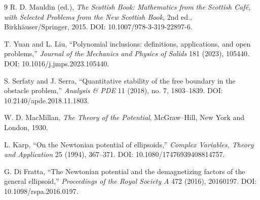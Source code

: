 \documentclass[11pt]{article}
\theoremstyle{definition}
\theoremstyle{remark}
\newcommand{\1}{\mathbf{1}}
\begin{document}
\begin{thebibliography}{9}
R. D. Mauldin (ed.), \emph{The Scottish Book: Mathematics from the Scottish Caf\'e, with Selected Problems from the New Scottish Book}, 2nd ed., Birkh\"auser/Springer, 2015. DOI: 10.1007/978-3-319-22897-6.

T. Yuan and L. Liu, ``Polynomial inclusions: definitions, applications, and open problems,'' \emph{Journal of the Mechanics and Physics of Solids} 181 (2023), 105440. DOI: 10.1016/j.jmps.2023.105440.

S. Serfaty and J. Serra, ``Quantitative stability of the free boundary in the obstacle problem,'' \emph{Analysis \& PDE} 11 (2018), no. 7, 1803--1839. DOI: 10.2140/apde.2018.11.1803.

W. D. MacMillan, \emph{The Theory of the Potential}, McGraw--Hill, New York and London, 1930.

L. Karp, ``On the Newtonian potential of ellipsoids,'' \emph{Complex Variables, Theory and Application} 25 (1994), 367--371. DOI: 10.1080/17476939408814757.

G. Di Fratta, ``The Newtonian potential and the demagnetizing factors of the general ellipsoid,'' \emph{Proceedings of the Royal Society A} 472 (2016), 20160197. DOI: 10.1098/rspa.2016.0197.
\end{thebibliography}
\end{document}

